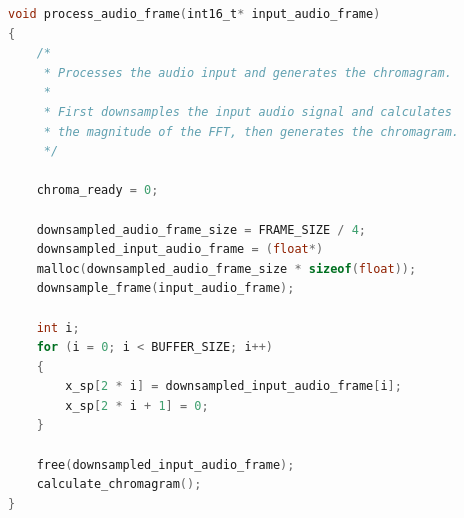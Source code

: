 \documentclass[journal]{IEEEtran}
\begin{document}
\onecolumn
\begin{lstlisting}[language = C, frame = single, caption = {An example code snippet from the chroma feature extraction containing the \texttt{process\_audio\_frame()} function.
This function is located in the \texttt{chromagram.c} file.}, captionpos = b, label = code:audio]
void process_audio_frame(int16_t* input_audio_frame)
{
    /*
     * Processes the audio input and generates the chromagram.
     *
     * First downsamples the input audio signal and calculates 
     * the magnitude of the FFT, then generates the chromagram.
     */

    chroma_ready = 0;

    downsampled_audio_frame_size = FRAME_SIZE / 4;
    downsampled_input_audio_frame = (float*)
    malloc(downsampled_audio_frame_size * sizeof(float));
    downsample_frame(input_audio_frame);

    int i;
    for (i = 0; i < BUFFER_SIZE; i++)
    {
        x_sp[2 * i] = downsampled_input_audio_frame[i];
        x_sp[2 * i + 1] = 0;
    }

    free(downsampled_input_audio_frame);
    calculate_chromagram();
}
\end{lstlisting}
\end{document}
